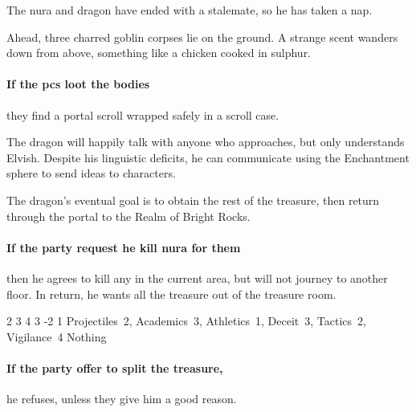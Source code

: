 \begin{multicols}{2}
\begin{exampletext}
  The nura and dragon have ended with a stalemate, so he has taken a nap.

\end{exampletext}

\begin{boxtext}

  Ahead, three charred goblin corpses lie on the ground.
  A strange scent wanders down from above, something like a chicken cooked in sulphur.

\end{boxtext}

\paragraph{If the \glspl{pc} loot the bodies}
they find a portal scroll wrapped safely in a scroll case.


The dragon will happily talk with anyone who approaches, but only understands Elvish.
\iftoggle{hardcore}{}{%
  Remind the players that they can spend a Story Point to say that they know another language, as long as they say when they learnt the language.
}
Despite his linguistic deficits, he can communicate using the Enchantment sphere to send ideas to characters.

The dragon's eventual goal is to obtain the rest of the treasure, then return through the portal to the Realm of Bright Rocks.

\paragraph{If the party request he kill nura for them}
then he agrees to kill any in the current area, but will not journey to another floor.
In return, he wants all the treasure out of the treasure room.

{2}%
{3}%
{{4}%
{3}%
{-2}}%
{}%
{1}%
{
  Projectiles~2, Academics~3, Athletics~1, Deceit~3, Tactics~2, Vigilance~4
}%
{Nothing}%
{
  \renewcommand\abilities{\flight}
  \knacks{\snapcaster}
  \addtocounter{Brawl}{3}
  \addtocounter{Fate}{2}
  \addtocounter{Fire}{2}
}

\showStdSpells

\paragraph{If the party offer to split the treasure,}
he refuses, unless they give him a good reason.


\end{multicols}
